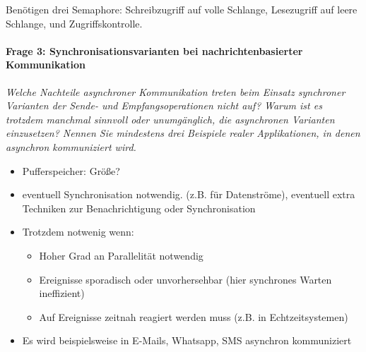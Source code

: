 \documentclass[a4paper]{article}
\begin{document}
Benötigen drei Semaphore: Schreibzugriff auf volle Schlange, Lesezugriff auf leere Schlange, und Zugriffskontrolle.

\vspace{10mm}
\paragraph{Frage 3: Synchronisationsvarianten bei nachrichtenbasierter Kommunikation}
\textit{Welche Nachteile asynchroner Kommunikation treten beim Einsatz synchroner Varianten der Sende- und Empfangsoperationen nicht auf? Warum ist es trotzdem manchmal sinnvoll oder unumgänglich, die asynchronen Varianten einzusetzen? Nennen Sie mindestens drei Beispiele realer Applikationen, in denen asynchron kommuniziert wird.}
\begin{itemize}
    \item Pufferspeicher: Größe?
    \item eventuell Synchronisation notwendig. (z.B. für Datenströme), eventuell extra Techniken zur Benachrichtigung oder Synchronisation
    \item Trotzdem notwenig wenn:
          \begin{itemize}
              \item Hoher Grad an Parallelität notwendig
              \item Ereignisse sporadisch oder unvorhersehbar (hier synchrones Warten ineffizient)
              \item Auf Ereignisse zeitnah reagiert werden muss (z.B. in Echtzeitsystemen)
          \end{itemize}
    \item Es wird beispielsweise in E-Mails, Whatsapp, SMS asynchron kommuniziert
\end{itemize}

\vspace{10mm}
\end{document}

